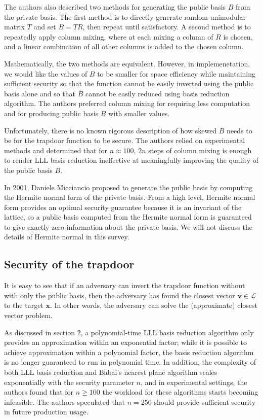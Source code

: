The authors also described two methods for generating the public basis $B$ from the private basis. The first method is to directly generate random unimodular matrix $T$ and set $B = TR$, then repeat until satisfactory. A second method is to repeatedly apply column mixing, where at each mixing a column of $R$ is chosen, and a linear combination of all other columns is added to the chosen column.

Mathematically, the two methods are equivalent. However, in implemenetation, we would like the values of $B$ to be smaller for space efficiency while maintaining sufficient security so that the function cannot be easily inverted using the public basis alone and so that $B$ cannot be easily reduced using basis reduction algorithm. The authors preferred column mixing for requiring less computation and for producing public basis $B$ with smaller values.

Unfortunately, there is no known rigorous description of how skewed $B$ needs to be for the trapdoor function to be secure. The authors relied on experimental methods and determined that for $n \approx 100$, $2n$ steps of column mixing is enough to render LLL basis reduction ineffective at meaningfully improving the quality of the public basis $B$.

In 2001, Daniele Micciancio proposed to generate the public basis by computing the Hermite normal form of the private basis\cite{micciancio2001improving}. From a high level, Hermite normal form provides an optimal security guarantee because it is an invariant of the lattice, so a public basis computed from the Hermite normal form is guaranteed to give exactly zero information about the private basis. We will not discuss the details of Hermite normal in this survey.

\subsection{Security of the trapdoor}
It is easy to see that if an adversary can invert the trapdoor function without with only the public basis, then the adversary has found the closest vector $\mathbf{v} \in \mathcal{L}$ to the target $\mathbf{x}$. In other words, the adversary can solve the (approximate) closest vector problem.

As discussed in section 2, a polynomial-time LLL basis reduction algorithm only provides an approximation within an exponential factor; while it is possible to achieve approximation within a polynomial factor, the basis reduction algorithm is no longer guaranteed to run in polynomial time. In addition, the complexity of both LLL basis reduction and Babai's nearest plane algorithm scales exponentially with the security parameter $n$, and in experimental settings, the authors found that for $n \geq 100$ the workload for these algorithms starts becoming infeasible. The authors speculated that $n = 250$ should provide sufficient security in future production usage.


